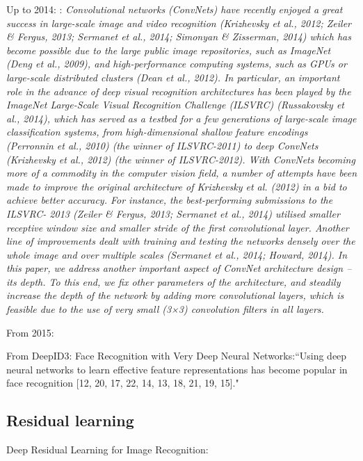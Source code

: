 \documentclass[12pt]{llncs}
\begin{document}
Up to 2014:
\cite{simonyan2014very}:
\emph{Convolutional networks (ConvNets) have recently enjoyed a great success in large-scale image
and video recognition (Krizhevsky et al., 2012; Zeiler \& Fergus, 2013; Sermanet et al., 2014;
Simonyan \& Zisserman, 2014) which has become possible due to the large public image repositories,
such as ImageNet (Deng et al., 2009), and high-performance computing systems, such as GPUs
or large-scale distributed clusters (Dean et al., 2012). In particular, an important role in the advance
of deep visual recognition architectures has been played by the ImageNet Large-Scale Visual Recognition
Challenge (ILSVRC) (Russakovsky et al., 2014), which has served as a testbed for a few
generations of large-scale image classification systems, from high-dimensional shallow feature encodings
(Perronnin et al., 2010) (the winner of ILSVRC-2011) to deep ConvNets (Krizhevsky et al.,
2012) (the winner of ILSVRC-2012).
With ConvNets becoming more of a commodity in the computer vision field, a number of attempts
have been made to improve the original architecture of Krizhevsky et al. (2012) in a
bid to achieve better accuracy. For instance, the best-performing submissions to the ILSVRC-
2013 (Zeiler \& Fergus, 2013; Sermanet et al., 2014) utilised smaller receptive window size and
smaller stride of the first convolutional layer. Another line of improvements dealt with training
and testing the networks densely over the whole image and over multiple scales (Sermanet et al.,
2014; Howard, 2014). In this paper, we address another important aspect of ConvNet architecture
design – its depth. To this end, we fix other parameters of the architecture, and steadily increase the
depth of the network by adding more convolutional layers, which is feasible due to the use of very
small (3×3) convolution filters in all layers.}


From 2015:



From DeepID3: Face Recognition with Very Deep Neural Networks:``Using deep neural networks to learn effective feature
representations has become popular in face recognition
[12, 20, 17, 22, 14, 13, 18, 21, 19, 15]."

\subsection{Residual learning}

Deep Residual Learning for Image Recognition:
\end{document}
